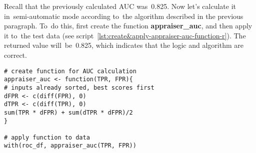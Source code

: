 \documentclass[]{scrreprt}
\begin{document}
Recall that the previously calculated AUC was~0.825. Now let's calculate it in~semi-automatic mode according to~the algorithm described in the previous paragraph. To~do this, first create the function \textbf{appraiser\_auc}, and then apply it to~the test data (see script~\ref{lst:create&apply-appraiser-auc-function-r}). The returned value will~be~0.825, which indicates that the logic and algorithm are correct.
%
\begin{lstlisting}[float, caption = Creating a function to calculate AUC in semi-automatic mode and applying it to test data, firstnumber=1, label= lst:create&apply-appraiser-auc-function-r]
# create function for AUC calculation
appraiser_auc <- function(TPR, FPR){
# inputs already sorted, best scores first 
dFPR <- c(diff(FPR), 0)
dTPR <- c(diff(TPR), 0)
sum(TPR * dFPR) + sum(dTPR * dFPR)/2
}

# apply function to data
with(roc_df, appraiser_auc(TPR, FPR))
\end{lstlisting}
\end{document}
